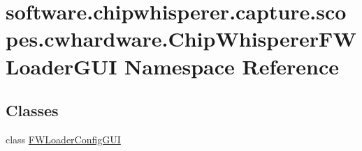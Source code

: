 \hypertarget{namespacesoftware_1_1chipwhisperer_1_1capture_1_1scopes_1_1cwhardware_1_1ChipWhispererFWLoaderGUI}{}\section{software.\+chipwhisperer.\+capture.\+scopes.\+cwhardware.\+Chip\+Whisperer\+F\+W\+Loader\+G\+U\+I Namespace Reference}
\label{namespacesoftware_1_1chipwhisperer_1_1capture_1_1scopes_1_1cwhardware_1_1ChipWhispererFWLoaderGUI}
\subsection*{Classes}
\begin{DoxyCompactItemize}
\item 
class \hyperlink{classsoftware_1_1chipwhisperer_1_1capture_1_1scopes_1_1cwhardware_1_1ChipWhispererFWLoaderGUI_1_1FWLoaderConfigGUI}{F\+W\+Loader\+Config\+G\+U\+I}
\end{DoxyCompactItemize}
